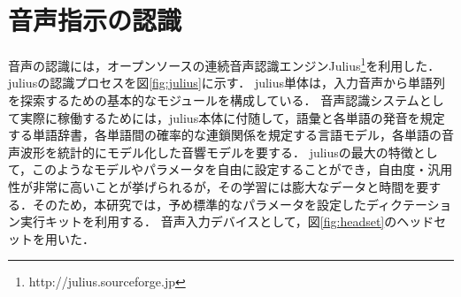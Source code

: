 \section{音声指示の認識}
音声の認識には，オープンソースの連続音声認識エンジンJulius\footnote{http://julius.sourceforge.jp}を利用した．
juliusの認識プロセスを図{\ref{fig:julius}}に示す．
julius単体は，入力音声から単語列を探索するための基本的なモジュールを構成している．
音声認識システムとして実際に稼働するためには，julius本体に付随して，語彙と各単語の発音を規定する単語辞書，各単語間の確率的な連鎖関係を規定する言語モデル，各単語の音声波形を統計的にモデル化した音響モデルを要する．
juliusの最大の特徴として，このようなモデルやパラメータを自由に設定することができ，自由度・汎用性が非常に高いことが挙げられるが，その学習には膨大なデータと時間を要する．そのため，本研究では，予め標準的なパラメータを設定したディクテーション実行キットを利用する．
音声入力デバイスとして，図{\ref{fig:headset}}のヘッドセットを用いた．
%
